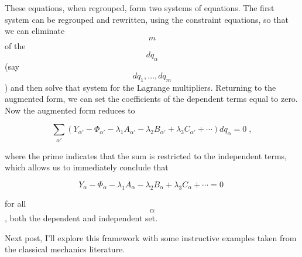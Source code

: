 \documentclass[12pt]{article}
\begin{document}
These equations, when regrouped, form two systems of equations.  The first system can be regrouped and rewritten, using the constraint equations, so that we can eliminate $$m$$ of the $$dq_\alpha$$ (say $$dq_1,\ldots,dq_m$$) and then solve that system for the Lagrange multipliers. Returning to the augmented form, we can set the coefficients of the dependent terms equal to zero.  Now the augmented form reduces to

\[ \sum_{\alpha'} (Y_{\alpha'} - \Phi_{\alpha'} - \lambda_1 A_{\alpha'} - \lambda_2 B_{\alpha'} + \lambda_3 C_{\alpha'} + \cdots ) dq_\alpha = 0 \; ,\]

where the prime indicates that the sum is restricted to the independent terms, which allows us to immediately conclude that

\[ Y_\alpha - \Phi_\alpha - \lambda_1 A_\alpha - \lambda_2 B_\alpha + \lambda_3 C_\alpha + \cdots  = 0 \; \]

for all $$\alpha$$, both the dependent and independent set.  

Next post, I'll explore this framework with some instructive examples taken from the classical mechanics literature.

 
\end{document}

